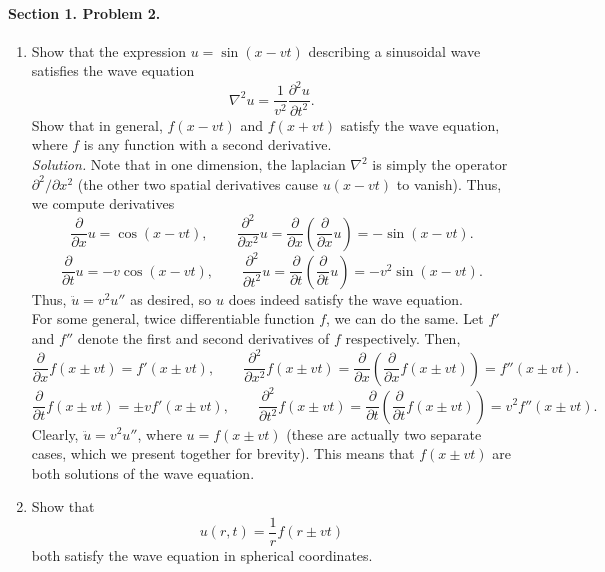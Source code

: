 \documentclass[10pt]{article}
\newcommand\ppx[1]{\frac{\partial #1}{\partial x}}
\newcommand\ppt[1]{\frac{\partial #1}{\partial t}}
\newcommand\pp[3][]{\frac{\partial^{#1}{#2}}{\partial {#3}^{#1}}}
\newcommand\lapl[1]{\nabla^2 #1}
\begin{document}
        \paragraph{Section 1. Problem 2.}
        \begin{enumerate}
                \item Show that the expression $u = \sin(x - vt)$ describing a sinusoidal wave satisfies the wave equation
                \[
                        \lapl{u} = \frac{1}{v^2}\pp[2]{u}{t}.
                \]
                Show that in general, $f(x - vt)$ and $f(x + vt)$ satisfy the wave equation, where $f$ is any function with a second derivative. \\

                \textit{Solution.} Note that in one dimension, the laplacian $\lapl{}$ is simply the operator $\partial^2 /\partial x^2$
                (the other two spatial derivatives cause $u(x - vt)$ to vanish).
                Thus, we compute derivatives
                \[
                        \ppx{}u = \cos(x - vt),\quad\quad \pp[2]{}{x}u = \ppx{}\left(\ppx{}u\right) = -\sin(x - vt).
                \]
                \[
                        \ppt{}u = -v\cos(x - vt),\quad\quad \pp[2]{}{t}u = \ppt{}\left(\ppt{}u\right) = -v^2\sin(x - vt).
                \]
                Thus, $\ddot{u} = v^2 u''$ as desired, so $u$ does indeed satisfy the wave equation. \\

                For some general, twice differentiable function $f$, we can do the same. Let $f'$ and $f''$ denote the first and second
                derivatives of $f$ respectively. Then,
                \[
                        \ppx{}f(x \pm vt) = f'(x \pm vt),\quad\quad \pp[2]{}{x}f(x \pm vt) = \ppx{}\left(\ppx{}f(x \pm vt)\right) = f''(x \pm vt).
                \]
                \[
                        \ppt{}f(x \pm vt) = \pm vf'(x \pm vt),\quad\quad \pp[2]{}{t}f(x \pm vt) = \ppt{}\left(\ppt{}f(x \pm vt)\right) = v^2 f''(x \pm vt).
                \]
                Clearly, $\ddot{u} = v^2 u''$, where $u = f(x \pm vt)$ (these are actually two separate cases, which we present together for brevity).
                This means that $f(x \pm vt)$ are both solutions of the wave equation.

                \item Show that 
                \[
                        u(r, t) = \frac{1}{r} f(r \pm vt)
                \]
                both satisfy the wave equation in spherical coordinates. \\


\end{enumerate}
\end{document}
